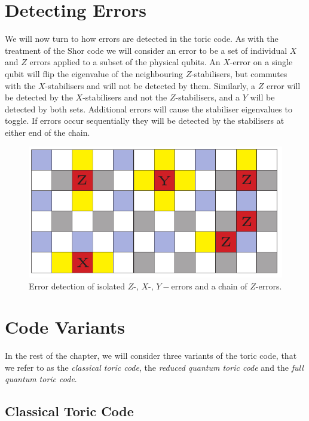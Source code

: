 \section{Detecting Errors}

We will now turn to how errors are detected in the toric code. As with the treatment of the Shor code we will consider an error to be a set of individual $X$ and $Z$ errors applied to a subset of the physical qubits. An $X$-error on a single qubit will flip the eigenvalue of the neighbouring $Z$-stabilisers, but commutes with the $X$-stabilisers and will not be detected by them. Similarly, a $Z$ error will be detected by the $X$-stabilisers and not the $Z$-stabilisers, and a $Y$ will be detected by both sets. Additional errors will cause the stabiliser eigenvalues to toggle. If errors occur sequentially they will be detected by the stabilisers at either end of the chain.


\begin{figure}[htb]
  \begin{center}
    \includegraphics{assets/basic_errors.pdf}
  \end{center}
  \caption{Error detection of isolated $Z$-, $X$-, $Y-$errors and a chain of $Z$-errors.}
  \label{basic_errors}
\end{figure}

\section{Code Variants}

In the rest of the chapter, we will consider three variants of the toric code, that we refer to as the \textit{classical toric code}, the \textit{reduced quantum toric code} and the \textit{full quantum toric code}.

\subsection{Classical Toric Code}

